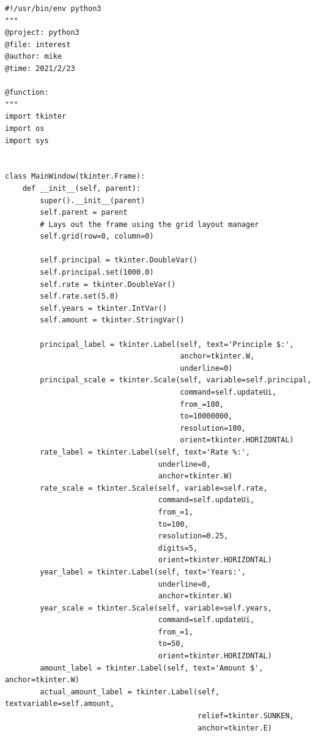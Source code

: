 \begin{lstlisting}
#!/usr/bin/env python3
"""
@project: python3
@file: interest
@author: mike
@time: 2021/2/23
 
@function:
"""
import tkinter
import os
import sys


class MainWindow(tkinter.Frame):
    def __init__(self, parent):
        super().__init__(parent)
        self.parent = parent
        # Lays out the frame using the grid layout manager
        self.grid(row=0, column=0)

        self.principal = tkinter.DoubleVar()
        self.principal.set(1000.0)
        self.rate = tkinter.DoubleVar()
        self.rate.set(5.0)
        self.years = tkinter.IntVar()
        self.amount = tkinter.StringVar()

        principal_label = tkinter.Label(self, text='Principle $:',
                                        anchor=tkinter.W,
                                        underline=0)
        principal_scale = tkinter.Scale(self, variable=self.principal,
                                        command=self.updateUi,
                                        from_=100,
                                        to=10000000,
                                        resolution=100,
                                        orient=tkinter.HORIZONTAL)
        rate_label = tkinter.Label(self, text='Rate %:',
                                   underline=0,
                                   anchor=tkinter.W)
        rate_scale = tkinter.Scale(self, variable=self.rate,
                                   command=self.updateUi,
                                   from_=1,
                                   to=100,
                                   resolution=0.25,
                                   digits=5,
                                   orient=tkinter.HORIZONTAL)
        year_label = tkinter.Label(self, text='Years:',
                                   underline=0,
                                   anchor=tkinter.W)
        year_scale = tkinter.Scale(self, variable=self.years,
                                   command=self.updateUi,
                                   from_=1,
                                   to=50,
                                   orient=tkinter.HORIZONTAL)
        amount_label = tkinter.Label(self, text='Amount $', anchor=tkinter.W)
        actual_amount_label = tkinter.Label(self, textvariable=self.amount,
                                            relief=tkinter.SUNKEN,
                                            anchor=tkinter.E)


\end{lstlisting}
